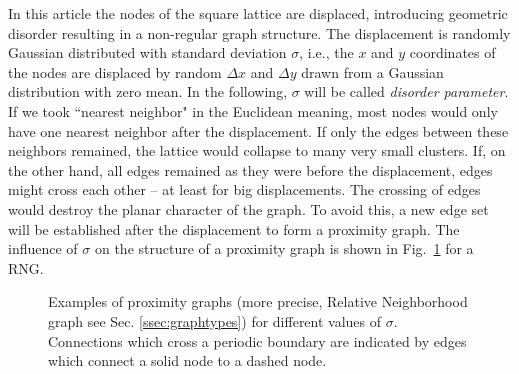 \documentclass[pre,twocolumn,groupedaddress,showpacs,showkeys,amsmath,amssymb,floatfix]{revtex4-1}
\begin{document}
            In this article the nodes of the square lattice are
            displaced, introducing geometric disorder resulting in a non-regular graph
            structure.
            The displacement is randomly Gaussian distributed with standard
            deviation \(\sigma\), i.e., the \(x\) and \(y\) coordinates of the
            nodes are displaced by random \(\Delta x\) and \(\Delta y\) drawn
            from a Gaussian distribution with zero mean.
            In the following, \(\sigma\) will be called \emph{disorder parameter}.
            If we took ``nearest neighbor" in the Euclidean meaning, most nodes
            would only have one nearest neighbor after the
            displacement. If only the edges between these neighbors remained,
            the lattice would collapse to many very small clusters. If, on the
            other hand, all edges remained as they were before the displacement,
            edges might cross each other -- at least for big displacements.
            The crossing of edges would destroy the planar character of the graph.
            To avoid this, a new edge set will be established after the displacement
            to form a proximity graph. The influence of $\sigma$ on the
            structure of a proximity graph is shown in Fig.~\ref{fig:RNG_sigma}
            for a RNG.
            \begin{figure}[htb]
                \centering
                \caption[Examples of RNG for different $\sigma$]
                {
                    Examples of proximity graphs (more precise, Relative Neighborhood
                    graph see Sec. \ref{ssec:graphtypes}) for different values of $\sigma$.
                    Connections which cross a periodic boundary are indicated
                    by edges which connect a solid node to a dashed node.
                }
                \label{fig:RNG_sigma}
            \end{figure}
\end{document}
